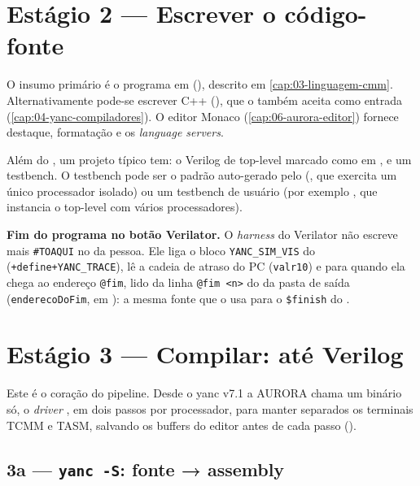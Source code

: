 \section{Estágio 2 — Escrever o código-fonte}
\label{sec:17-codigo}

O insumo primário é o programa em \cmm{} (), descrito em
\autoref{cap:03-linguagem-cmm}. Alternativamente pode-se escrever C++
(), que o  também aceita como entrada
(\autoref{cap:04-yanc-compiladores}). O editor Monaco (\autoref{cap:06-aurora-editor})
fornece destaque, formatação e os \emph{language servers}.

Além do , um projeto típico tem: o Verilog de top-level marcado como
 em , e um testbench. O testbench pode
ser o padrão auto-gerado pelo  (, que exercita um
único processador isolado) ou um testbench de usuário (por exemplo
, que instancia o top-level com vários processadores).

\begin{nota}
\textbf{Fim do programa no botão Verilator.} O \emph{harness} do Verilator não
escreve mais \lstinline|#TOAQUI| no  da pessoa. Ele liga o bloco
\lstinline|YANC_SIM_VIS| do  (\lstinline|+define+YANC_TRACE|), lê a
cadeia de atraso do PC (\lstinline|valr10|) e para quando ela chega ao endereço
\lstinline|@fim|, lido da linha \lstinline|@fim <n>| do  da pasta
de saída (\lstinline|enderecoDoFim|, em ): a mesma
fonte que o  usa para o \lstinline|$finish| do .
\end{nota}

\section{Estágio 3 — Compilar: \texorpdfstring{\cmm{}}{C+-} até Verilog}
\label{sec:17-compilar}

Este é o coração do pipeline. Desde o yanc v7.1 a AURORA chama um binário só, o
\emph{driver} , em dois passos por processador, para
manter separados os terminais TCMM e TASM, salvando os buffers do editor antes de
cada passo ().

\subsection{3a — \texttt{yanc -S}: fonte → assembly}

